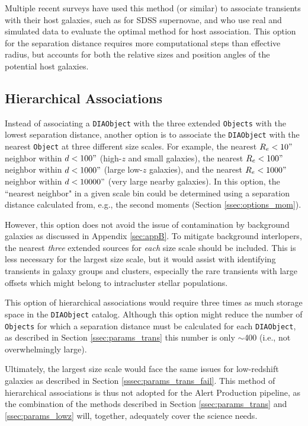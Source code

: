 \documentclass[DM,authoryear,toc]{lsstdoc}
\begin{document}
Multiple recent surveys have used this method (or similar) to associate transients with their host galaxies, such as \citet{2018PASP..130f4002S} for SDSS supernovae, and \citet{2016AJ....152..154G} who use real and simulated data to evaluate the optimal method for host association.
This option for the separation distance requires more computational steps than effective radius, but accounts for both the relative sizes and position angles of the potential host galaxies. 


\subsection{Hierarchical Associations}\label{ssec:options_hier}

Instead of associating a {\tt DIAObject} with the three extended {\tt Objects} with the lowest separation distance, another option is to associate the {\tt DIAObject} with the  nearest {\tt Object} at three different size scales.
For example, the nearest $R_e<10"$ neighbor within $d<100"$ (high-$z$ and small galaxies), the nearest $R_e<100"$ neighbor within $d<1000"$ (large low-$z$ galaxies), and the nearest $R_e<1000"$ neighbor within $d<10000"$ (very large nearby galaxies).
In this option, the ``nearest neighbor" in a given scale bin could be determined using a separation distance calculated from, e.g., the second moments (Section \ref{ssec:options_mom}).

However, this option does not avoid the issue of contamination by background galaxies as discussed in Appendix \ref{sec:appB}.
To mitigate background interlopers, the nearest \emph{three} extended sources for \textit{each} size scale should be included.
This is less necessary for the largest size scale, but it would assist with identifying transients in galaxy groups and clusters, especially the rare transients with large offsets which might belong to intracluster stellar populations.

This option of hierarchical associations would require three times as much storage space in the {\tt DIAObject} catalog.
Although this option might reduce the number of {\tt Objects} for which a separation distance must be calculated for each {\tt DIAObject}, as described in Section \ref{ssec:params_trans} this number is only $\sim$400 (i.e., not overwhelmingly large). 

Ultimately, the largest size scale would face the same issues for low-redshift galaxies as described in Section \ref{sssec:params_trans_fail}. 
This method of hierarchical associations is thus not adopted for the Alert Production pipeline, as the combination of the methods described in Section \ref{ssec:params_trans} and \ref{ssec:params_lowz} will, together, adequately cover the science needs.
\end{document}
